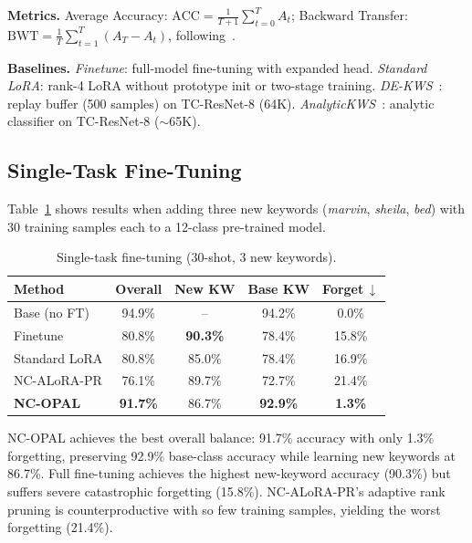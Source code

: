 \documentclass{Interspeech}
\begin{document}
\noindent\textbf{Metrics.}\quad
Average Accuracy:
$\text{ACC} = \frac{1}{T{+}1}\sum_{t=0}^{T} A_t$;\;
Backward Transfer:
$\text{BWT} = \frac{1}{T}\sum_{t=1}^{T}(A_T - A_t)$,
following~\cite{lopezpaz2017gem}.

\noindent\textbf{Baselines.}\quad
\emph{Finetune}: full-model fine-tuning with expanded head.\;
\emph{Standard LoRA}: rank-4 LoRA without prototype init or two-stage training.\;
\emph{DE-KWS}~\cite{peng2024dekws}: replay buffer (500 samples) on TC-ResNet-8 (64K).\;
\emph{AnalyticKWS}~\cite{peng2025analytickws}: analytic classifier on TC-ResNet-8 (${\sim}$65K).

\subsection{Single-Task Fine-Tuning}

Table~\ref{tab:singletask} shows results when adding three new keywords (\textit{marvin}, \textit{sheila}, \textit{bed}) with 30 training samples each to a 12-class pre-trained model.

\begin{table}[t]
\centering
\caption{Single-task fine-tuning (30-shot, 3 new keywords).}
\label{tab:singletask}
\setlength{\tabcolsep}{4pt}
\begin{tabular}{@{}lcccc@{}}
\toprule
Method & Overall & New KW & Base KW & Forget\,$\downarrow$ \\
\midrule
Base (no FT)        & 94.9\% & --            & 94.2\%          & 0.0\% \\
Finetune            & 80.8\% & \textbf{90.3\%} & 78.4\%       & 15.8\% \\
Standard LoRA       & 80.8\% & 85.0\%        & 78.4\%          & 16.9\% \\
NC-ALoRA-PR         & 76.1\% & 89.7\%        & 72.7\%          & 21.4\% \\
\textbf{NC-OPAL}    & \textbf{91.7\%} & 86.7\% & \textbf{92.9\%} & \textbf{1.3\%} \\
\bottomrule
\end{tabular}
\end{table}

NC-OPAL achieves the best overall balance: 91.7\% accuracy with only 1.3\% forgetting, preserving 92.9\% base-class accuracy while learning new keywords at 86.7\%.
Full fine-tuning achieves the highest new-keyword accuracy (90.3\%) but suffers severe catastrophic forgetting (15.8\%).
NC-ALoRA-PR's adaptive rank pruning is counterproductive with so few training samples, yielding the worst forgetting (21.4\%).
\end{document}
